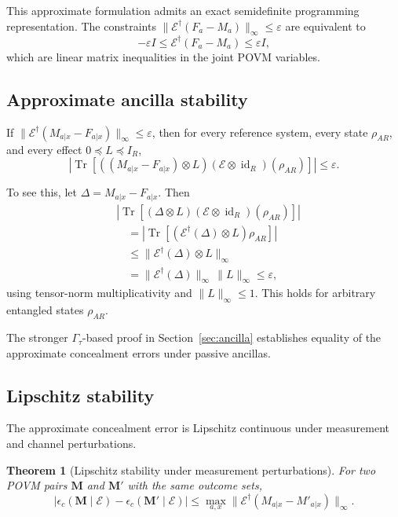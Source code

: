 \documentclass[
aps,pra,twocolumn,10pt,
superscriptaddress,longbibliography,floatfix
]{revtex4-2}
\DeclareMathOperator{\Tr}{Tr}
\DeclareMathOperator{\id}{id}
\newtheorem{theorem}{Theorem}[section]
\begin{document}
This approximate formulation admits an exact semidefinite programming representation. The constraints $\|\mathcal{E}^\dagger(F_a - M_a)\|_\infty \le \varepsilon$ are equivalent to
\[
-\varepsilon I \le \mathcal{E}^\dagger(F_a - M_a) \le \varepsilon I,
\]
which are linear matrix inequalities in the joint POVM variables.

\subsection{Approximate ancilla stability}

If $\|\mathcal E^\dagger(M_{a|x}-F_{a|x})\|_\infty \le \varepsilon$, then for every reference system, every state $\rho_{AR}$, and every effect $0\preceq L\preceq I_R$,
\[
\left|\Tr[((M_{a|x}-F_{a|x})\otimes L)(\mathcal E\otimes\id_R)(\rho_{AR})]\right| \le \varepsilon.
\]

To see this, let $\Delta = M_{a|x}-F_{a|x}$. Then
\[
\begin{aligned}
&\left|\Tr[(\Delta\otimes L)(\mathcal E\otimes\id_R)(\rho_{AR})]\right|\\
&\quad= \left|\Tr[(\mathcal E^\dagger(\Delta)\otimes L)\rho_{AR}]\right|\\
&\quad\le \|\mathcal E^\dagger(\Delta)\otimes L\|_\infty\\
&\quad= \|\mathcal E^\dagger(\Delta)\|_\infty\,\|L\|_\infty \le \varepsilon,
\end{aligned}
\]
using tensor-norm multiplicativity and $\|L\|_\infty\le1$. This holds for arbitrary entangled states $\rho_{AR}$.

The stronger $\Gamma_\tau$-based proof in Section~\ref{sec:ancilla} establishes equality of the approximate concealment errors under passive ancillas.

\subsection{Lipschitz stability}

The approximate concealment error is Lipschitz continuous under measurement and channel perturbations.

\begin{theorem}[Lipschitz stability under measurement perturbations]
For two POVM pairs $\mathbf M$ and $\mathbf M'$ with the same outcome sets,
\[
\left|\epsilon_c(\mathbf M\mid\mathcal E)-\epsilon_c(\mathbf M'\mid\mathcal E)\right|
\le
\max_{a,x}\|\mathcal E^\dagger(M_{a|x}-M'_{a|x})\|_\infty.
\]
\end{theorem}
\end{document}
